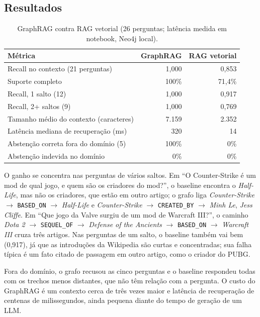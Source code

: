 \documentclass[12pt]{article}
\begin{document}
\subsection{Resultados}
\begin{table}[ht]\centering\small
\caption{GraphRAG contra RAG vetorial (26 perguntas; latência medida em notebook, Neo4j local).}
\begin{tabular}{lrr}\toprule
\textbf{Métrica} & \textbf{GraphRAG} & \textbf{RAG vetorial} \\ \midrule
Recall no contexto (21 perguntas) & 1,000 & 0,853 \\
Suporte completo & 100\% & 71,4\% \\
Recall, 1 salto (12) & 1,000 & 0,917 \\
Recall, 2+ saltos (9) & 1,000 & 0,769 \\
Tamanho médio do contexto (caracteres) & 7.159 & 2.352 \\
Latência mediana de recuperação (ms) & 320 & 14 \\
Abstenção correta fora do domínio (5) & 100\% & 0\% \\
Abstenção indevida no domínio & 0\% & 0\% \\
\bottomrule\end{tabular}
\end{table}
O ganho se concentra nas perguntas de vários saltos. Em ``O Counter-Strike é um mod de qual jogo, e quem são os criadores do mod?'', o baseline encontra o \emph{Half-Life}, mas não os criadores, que estão em outro artigo; o grafo liga \emph{Counter-Strike} $\rightarrow$ \texttt{BASED\_ON} $\rightarrow$ \emph{Half-Life} e \emph{Counter-Strike} $\rightarrow$ \texttt{CREATED\_BY} $\rightarrow$ \emph{Minh Le}, \emph{Jess Cliffe}. Em ``Que jogo da Valve surgiu de um mod de Warcraft III?'', o caminho \emph{Dota 2} $\rightarrow$ \texttt{SEQUEL\_OF} $\rightarrow$ \emph{Defense of the Ancients} $\rightarrow$ \texttt{BASED\_ON} $\rightarrow$ \emph{Warcraft III} cruza três artigos. Nas perguntas de um salto, o baseline também vai bem (0,917), já que as introduções da Wikipedia são curtas e concentradas; sua falha típica é um fato citado de passagem em outro artigo, como o criador do PUBG.

Fora do domínio, o grafo recusou as cinco perguntas e o baseline respondeu todas com os trechos menos distantes, que não têm relação com a pergunta. O custo do GraphRAG é um contexto cerca de três vezes maior e latência de recuperação de centenas de milissegundos, ainda pequena diante do tempo de geração de um LLM.
\end{document}
